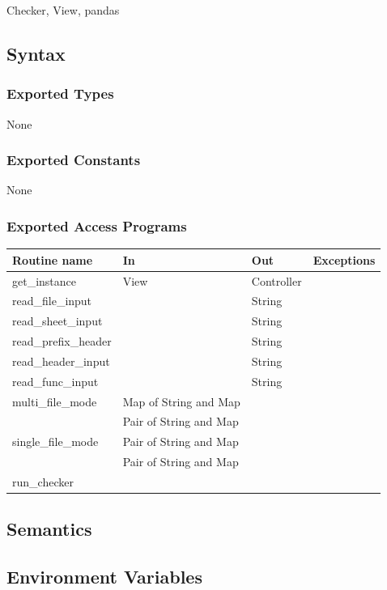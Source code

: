\documentclass[12pt]{article}
\begin{document}
Checker, View, pandas

\subsection* {Syntax}

\subsubsection* {Exported Types}

None

\subsubsection* {Exported Constants}

None

\subsubsection* {Exported Access Programs}

\begin{tabular}{| l | l | l | p{4.7cm} |}
\hline
\textbf{Routine name} & \textbf{In} & \textbf{Out} & \textbf{Exceptions}\\
\hline
get\_instance & View & Controller & \\
\hline
read\_file\_input & & String & \\
\hline
read\_sheet\_input & & String & \\
\hline
read\_prefix\_header & & String & \\
\hline
read\_header\_input & & String & \\
\hline
read\_func\_input & & String & \\
\hline
multi\_file\_mode & Map of String and Map & &\\
                  & Pair of String and Map &  & \\
\hline
single\_file\_mode & Pair of String and Map & &\\
                   & Pair of String and Map & & \\
\hline
run\_checker & & & \\
\hline
\end{tabular}

\subsection* {Semantics}

\subsection*{Environment Variables}
\end{document}

